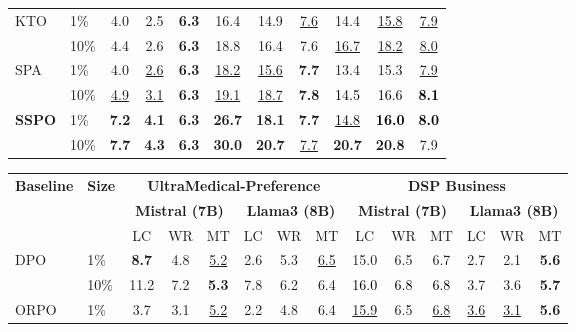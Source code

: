 \documentclass{article} %
\newcommand\rebuttal[1]{\textcolor{black}{#1}}
\begin{document}
\begin{table}[t]
\begin{tabular}{ll ccc ccc ccc}
        \midrule
        KTO & 1\% & 4.0 & 2.5 & \textbf{6.3} & 16.4 & 14.9 & \underline{7.6} & 14.4 & \underline{15.8} & \underline{7.9} \\
            & 10\% & 4.4 & 2.6 & \textbf{6.3} & 18.8 & 16.4 & 7.6 & \underline{16.7} & \underline{18.2} & \underline{8.0} \\
        \midrule
        SPA & 1\% & 4.0 & \underline{2.6} & \textbf{6.3} & \underline{18.2} & \underline{15.6} & \textbf{7.7} & 13.4 & 15.3 & \underline{7.9} \\
            & 10\%  & \underline{4.9} & \underline{3.1} & \textbf{6.3} & \underline{19.1} & \underline{18.7} & \textbf{7.8} & \rebuttal{14.5} & \rebuttal{16.6} & \rebuttal{\textbf{8.1}} \\
        \midrule
        \midrule
        \textbf{SSPO} & 1\% & \textbf{7.2} & \textbf{4.1} & \textbf{6.3} & \textbf{26.7} & \textbf{18.1} & \textbf{7.7} & \rebuttal{\underline{14.8}} & \rebuttal{\textbf{16.0}} & \rebuttal{\textbf{8.0}} \\ 
                      & 10\%  & \textbf{7.7} & \textbf{4.3} & \textbf{6.3} & \textbf{30.0} & \textbf{20.7} & \underline{7.7} & \textbf{20.7} & \textbf{20.8} & 7.9 \\
        \toprule 
    \end{tabular} 
    \setlength{\tabcolsep}{1.8mm}
    \begin{tabular}{ll ccc ccc ccc ccc}
        \multirow{3}{*}{\textbf{Baseline}} & \multirow{3}{*}{\textbf{Size}} & \multicolumn{6}{c}{\textbf{UltraMedical-Preference}} & \multicolumn{6}{c}{\textbf{DSP Business}} \\
        \cmidrule(lr){3-8} \cmidrule(lr){9-14}
        & & \multicolumn{3}{c}{\textbf{Mistral (7B)}} & \multicolumn{3}{c}{\textbf{Llama3 (8B)}} & \multicolumn{3}{c}{\textbf{Mistral (7B)}} & \multicolumn{3}{c}{\textbf{Llama3 (8B)}} \\
        \cmidrule(lr){3-5} \cmidrule(lr){6-8} \cmidrule(lr){9-11} \cmidrule(lr){12-14}
        & & LC & WR & MT & LC & WR & MT & LC & WR & MT & LC & WR & MT \\
        \midrule
        DPO & 1\% & \textbf{8.7} & 4.8 & \underline{5.2} & 2.6 & 5.3 & \underline{6.5} & 15.0 & 6.5 & 6.7 & 2.7 & 2.1 & \textbf{5.6} \\
        & 10\% & 11.2 & 7.2 & \textbf{5.3} & 7.8 & 6.2 & 6.4 & \rebuttal{16.0} & \rebuttal{6.8} & \rebuttal{6.8} & 3.7 & 3.6 & \textbf{5.7} \\
        \midrule
        ORPO & 1\% & 3.7 & 3.1 & \underline{5.2} & 2.2 & 4.8 & 6.4 & \underline{15.9} & 6.5 & \underline{6.8} & \underline{3.6} & \underline{3.1} & \textbf{5.6} \\

\end{tabular}
\end{table}
\end{document}
